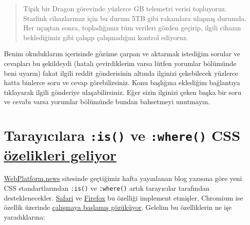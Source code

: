 \documentclass[11pt]{article}
\begin{document}
\begin{itemize}
\begin{quote}
Tipik bir Dragon görevinde yüzlerce GB telemetri verisi topluyoruz. Starlink
cihazlarımız için bu durum 5TB gibi rakamlara ulaşmış durumda. Her uçuştan
sonra, topladığımız tüm verileri gözden geçirip, ilgili cihazın beklediğimiz
gibi çalışıp çalışmadığını kontrol ediyoruz.
\end{quote}
\end{itemize}

Benim okuduklarım içerisinde gözüme çarpan ve aktarmak istediğim sorular ve
cevapları bu şekildeydi (hatalı çevirdiklerim varsa lütfen yorumlar bölümünde
beni uyarın) fakat ilgili reddit gönderisinin altında ilginizi çekebilecek
yüzlerce hatta binlerce soru ve cevap görebilirsiniz. Konu başlığına eklediğim
bağlantıya tıklayarak ilgili gönderiye ulaşabilirsiniz. Eğer sizin ilginizi
çeken başka bir soru ve cevabı varsa yorumlar bölümünde bundan bahsetmeyi
unutmayın.
\section{Tarayıcılara \texttt{:is()} ve \texttt{:where()} CSS \href{https://webplatform.news/issues/2020-06-04}{özelikleri geliyor}}
\label{sec:org1c52d7c}
\href{https://webplatform.news/}{WebPlatform.news} sitesinde geçtiğimiz hafta yayınlanan blog yazısına göre yeni
CSS standartlarından \texttt{:is()} ve \texttt{:where()} artık tarayıcılar tarafından
desteklenecekler. \href{https://webkit.org/blog/10580/release-notes-for-safari-technology-preview-106/}{Safari} ve \href{https://www.fxsitecompat.dev/en-CA/docs/2020/is-pseudo-class-has-been-unprefixed/}{Firefox} bu özelliği implement etmişler, Chromium
ise özellik üzerinde \href{https://bugs.chromium.org/p/chromium/issues/detail?id=568705}{çalışmaya başlamış gözüküyor}. Gelelim bu özelliklerin ne
işe yaradıklarına:
\end{document}
